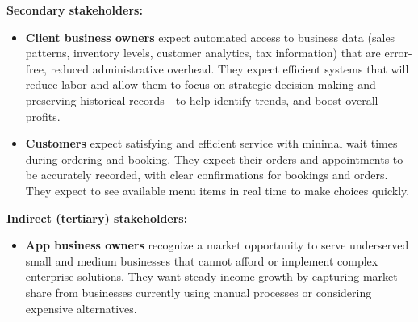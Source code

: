 \documentclass[]{VUMIFTemplateClass}
\begin{document}
\textbf{Secondary stakeholders:}
\begin{itemize}
    \item \textbf{Client business owners} expect automated access to business
    data (sales patterns, inventory levels, customer analytics, tax information)
    that are error-free, reduced administrative overhead. They expect efficient
    systems that will reduce labor and allow them to focus on strategic
    decision-making and preserving historical records—to help identify trends,
    and boost overall profits.
    
    \item \textbf{Customers} expect satisfying and efficient service with minimal wait times during ordering and booking. They expect their orders and appointments to be accurately recorded, with clear confirmations for bookings and orders. They expect to see available menu items in real time to make choices quickly.


\end{itemize}

\textbf{Indirect (tertiary) stakeholders:}
\begin{itemize}
    \item \textbf{App business owners} recognize a market opportunity to serve
    underserved small and medium businesses that cannot afford or implement
    complex enterprise solutions. They want steady income growth by capturing
    market share from businesses currently using manual processes or considering
    expensive alternatives.


\end{itemize}
\end{document}
